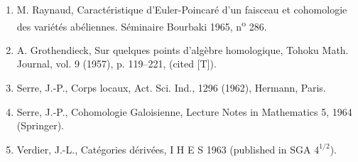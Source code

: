 \documentclass[11pt]{article}
\begin{document}
\begin{enumerate}
\item[{[1]}] M. Raynaud, Caractéristique d'Euler-Poincaré d'un faisceau et cohomologie des variétés abéliennes. Séminaire Bourbaki 1965, n\textsuperscript{o} 286.
\item[{[2]}] A. Grothendieck, Sur quelques points d'algèbre homologique, Tohoku Math. Journal, vol. 9 (1957), p. 119--221, (cited [T]).
\item[{[3]}] Serre, J.-P., Corps locaux, Act. Sci. Ind., 1296 (1962), Hermann, Paris.
\item[{[4]}] Serre, J.-P., Cohomologie Galoisienne, Lecture Notes in Mathematics 5, 1964 (Springer).
\item[{[5]}] Verdier, J.-L., Catégories dérivées, I H E S 1963 (published in SGA $4^{1/2}$).
\end{enumerate}
\end{document}
